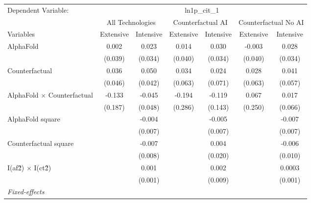 \begingroup
\centering
\begin{tabular}{lcccccc}
   \tabularnewline \midrule \midrule
   Dependent Variable: & \multicolumn{6}{c}{ln1p\_cit\_1}\\
 & \multicolumn{2}{c}{All Technologies} & \multicolumn{2}{c}{Counterfactual AI} & \multicolumn{2}{c}{Counterfactual No AI} \\
\cmidrule(lr){1-1}\cmidrule(lr){2-3} \cmidrule(lr){4-5} \cmidrule(lr){6-7}
Variables & \multicolumn{1}{c}{Extensive} & \multicolumn{1}{c}{Intensive} & \multicolumn{1}{c}{Extensive} & \multicolumn{1}{c}{Intensive} & \multicolumn{1}{c}{Extensive} & \multicolumn{1}{c}{Intensive} \\
\cmidrule(lr){1-1}\cmidrule(lr){2-2} \cmidrule(lr){3-3} \cmidrule(lr){4-4} \cmidrule(lr){5-5} \cmidrule(lr){6-6} \cmidrule(lr){7-7}
   AlphaFold                          & 0.002   & 0.023   & 0.014   & 0.030   & -0.003  & 0.028\\   
                                      & (0.039) & (0.034) & (0.040) & (0.034) & (0.040) & (0.034)\\   
   Counterfactual                     & 0.036   & 0.050   & 0.034   & 0.024   & 0.028   & 0.041\\   
                                      & (0.046) & (0.042) & (0.063) & (0.071) & (0.063) & (0.057)\\   
   AlphaFold $\times$ Counterfactual  & -0.133  & -0.045  & -0.194  & -0.119  & 0.067   & 0.017\\   
                                      & (0.187) & (0.048) & (0.286) & (0.143) & (0.250) & (0.066)\\   
   AlphaFold square                   &         & -0.004  &         & -0.005  &         & -0.007\\   
                                      &         & (0.007) &         & (0.007) &         & (0.007)\\   
   Counterfactual square              &         & -0.007  &         & 0.004   &         & -0.006\\   
                                      &         & (0.008) &         & (0.020) &         & (0.010)\\   
   I(af\^2) $\times$ I(ct\^2)         &         & 0.001   &         & 0.002   &         & 0.0003\\   
                                      &         & (0.001) &         & (0.009) &         & (0.001)\\   
   \midrule
   \emph{Fixed-effects}\\

\end{tabular}
